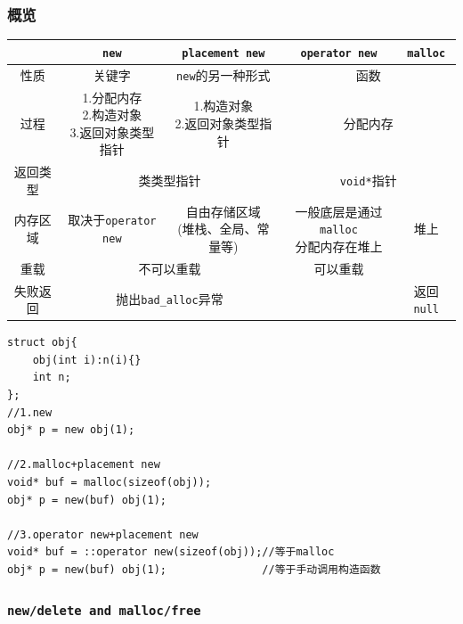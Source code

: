 \subsubsection{概览}
\begin{center}
	\begin{tabular}[h]{|c|c|c|c|c|}
		\hline
		~&{\tt new}&{\tt placement new}&{\tt operator new}&{\tt malloc}\\
		\hline
		性质&关键字&{\tt new}的另一种形式&\multicolumn{2}{|c|}{函数}\\
		\hline
		过程&\makecell[c]{1.分配内存\\2.构造对象\\3.返回对象类型指针}&
			\makecell[c]{1.构造对象\\2.返回对象类型指针}&\multicolumn{2}{|c|}{分配内存}\\
		\hline
		返回类型&\multicolumn{2}{|c|}{类类型指针}&\multicolumn{2}{|c|}{{\tt void*}指针}\\
		\hline
		内存区域&取决于{\tt operator new}&
			\makecell[c]{自由存储区域\\(堆栈、全局、常量等)}&\makecell[c]{一般底层是通过{\tt malloc}\\分配内存在堆上}&堆上\\
		\hline
		重载&\multicolumn{2}{|c|}{不可以重载}&可以重载&\\
		\hline
		失败返回&\multicolumn{2}{|c|}{抛出{\tt bad\_alloc}异常}& &返回{\tt null}\\
		\hline
	\end{tabular}
\end{center}
\begin{lstlisting}[title=三种创建堆上对象方法]
struct obj{ 
	obj(int i):n(i){}
	int n;
};
//1.new
obj* p = new obj(1);

//2.malloc+placement new
void* buf = malloc(sizeof(obj));
obj* p = new(buf) obj(1);

//3.operator new+placement new
void* buf = ::operator new(sizeof(obj));//等于malloc
obj* p = new(buf) obj(1);               //等于手动调用构造函数
\end{lstlisting}
\subsubsection{\tt new/delete and malloc/free}

